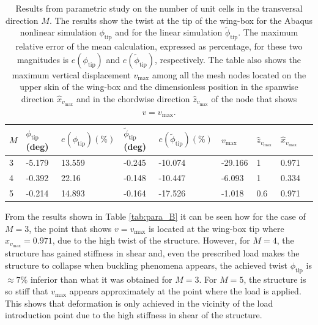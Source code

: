     \begin{table}[!htpb] %
      \centering
      \begin{tabular}{|l|l|l|l|l|l|l|l|l|}
      \hline
      $M$ & $\phi_{\mathrm{tip}}$ (deg) & $e(\phi_{\mathrm{tip}}) (\%)$ & $\tilde{\phi}_{\mathrm{tip}}$ (deg) & $e(\tilde{\phi}_{\mathrm{tip}}) (\%)$ & $v_{\mathrm{max}}$ & $\hat{z}_{v_{\mathrm{max}}}$ & $\hat{x}_{v_{\mathrm{max}}}$ \\ \hline
      3 & -5.179 & 13.559 & -0.245 & -10.074 & -29.166 & 1 & 0.971 \\ \hline
      4 & -0.392 & 22.16 & -0.148 & -10.447 & -6.093 & 1 & 0.334 \\ \hline
      5 & -0.214 & 14.893 & -0.164 & -17.526 & -1.018 & 0.6 & 0.971 \\ \hline
      \end{tabular}
      \caption[Results from parametric study on the number of unit cells in the transversal direction]{Results from parametric study on the number of unit cells in the transversal direction $M$. The results show the twist at the tip of the wing-box for the Abaqus nonlinear simulation $\phi_{\mathrm{tip}}$ and for the linear simulation $\tilde{\phi}_{\mathrm{tip}}$. The maximum relative error of the mean calculation, expressed as percentage, for these two magnitudes is $e(\phi_{\mathrm{tip}})$ and $e(\tilde{\phi}_{\mathrm{tip}})$, respectively. The table also shows the maximum vertical displacement $v_{\mathrm{max}}$ among all the mesh nodes located on the upper skin of the wing-box and the dimensionless position in the spanwise direction $\hat{x}_{v_{\mathrm{max}}}$ and in the chordwise direction $\hat{z}_{v_{\mathrm{max}}}$ of the node that shows $v = v_{\mathrm{max}}$.}
      \label{tab:para_M}
    \end{table}

    From the results shown in Table \ref{tab:para_B} it can be seen how for the case of $M = 3$, the point that shows $v = v_{\mathrm{max}}$ is located at the wing-box tip where $\hat{x}_{v_{\mathrm{max}}} = 0.971$, due to the high twist of the structure. However, for $M = 4$, the structure has gained stiffness in shear and, even the prescribed load makes the structure to collapse when buckling phenomena appears, the achieved twist $\phi_{\mathrm{tip}}$ is $\approx 7\%$ inferior than what it was obtained for $M = 3$. For $M = 5$, the structure is so stiff that $v_{\mathrm{max}}$ appears approximately at the point where the load is applied. This shows that deformation is only achieved in the vicinity of the load introduction point due to the high stiffness in shear of the structure.

